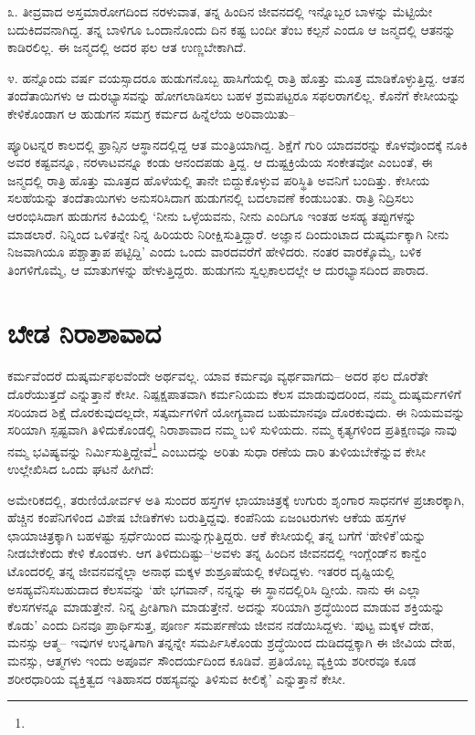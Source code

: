 ೩. ತೀವ್ರವಾದ ಅಸ್ತಮಾರೋಗದಿಂದ ನರಳುವಾತ, ತನ್ನ ಹಿಂದಿನ ಜೀವನದಲ್ಲಿ ಇನ್ನೊಬ್ಬರ ಬಾಳನ್ನು ಮೆಟ್ಟಿಯೇ ಬದುಕಿದವನಾಗಿದ್ದ. ತನ್ನ ಬಾಳಿಗೂ ಒಂದಾನೊಂದು ದಿನ ಕಷ್ಟ ಬಂದೀ ತೆಂಬ ಕಲ್ಪನೆ ಎಂದೂ ಆ ಜನ್ಮದಲ್ಲಿ ಆತನನ್ನು ಕಾಡಿರಲಿಲ್ಲ. ಈ ಜನ್ಮದಲ್ಲಿ ಅದರ ಫಲ ಆತ ಉಣ್ಣಬೇಕಾಗಿದೆ.

೪. ಹನ್ನೊಂದು ವರ್ಷ ವಯಸ್ಸಾದರೂ ಹುಡುಗನೊಬ್ಬ ಹಾಸಿಗೆಯಲ್ಲಿ ರಾತ್ರಿ ಹೊತ್ತು ಮೂತ್ರ ಮಾಡಿಕೊಳ್ಳುತ್ತಿದ್ದ. ಆತನ ತಂದೆತಾಯಿಗಳು ಆ ದುರಭ್ಯಾಸವನ್ನು ಹೋಗಲಾಡಿಸಲು ಬಹಳ ಶ್ರಮಪಟ್ಟರೂ ಸಫಲರಾಗಲಿಲ್ಲ. ಕೊನೆಗೆ ಕೇಸೀಯನ್ನು ಕೇಳಿಕೊಂಡಾಗ ಆ ಹುಡುಗನ ಸಮಗ್ರ ಕರ್ಮದ ಹಿನ್ನೆಲೆಯ ಅರಿವಾಯಿತು–

ಪ್ಯೂರಿಟನ್ನರ ಕಾಲದಲ್ಲಿ ಫ್ರಾನ್ಸಿನ ಆಸ್ಥಾನದಲ್ಲಿದ್ದ ಆತ ಮಂತ್ರಿಯಾಗಿದ್ದ. ಶಿಕ್ಷೆಗೆ ಗುರಿ ಯಾದವರನ್ನು ಕೊಳವೊಂದಕ್ಕೆ ನೂಕಿ ಅವರ ಕಷ್ಟವನ್ನೂ, ನರಳಾಟವನ್ನೂ ಕಂಡು ಆನಂದಪಡು ತ್ತಿದ್ದ. ಆ ದುಷ್ಟಕ್ರಿಯೆಯ ಸಂಕೇತವೋ ಎಂಬಂತೆ, ಈ ಜನ್ಮದಲ್ಲಿ ರಾತ್ರಿ ಹೊತ್ತು ಮೂತ್ರದ ಹೊಳೆಯಲ್ಲಿ ತಾನೇ ಬಿದ್ದುಕೊಳ್ಳುವ ಪರಿಸ್ಥಿತಿ ಅವನಿಗೆ ಬಂದಿತ್ತು. ಕೇಸೀಯ ಸಲಹೆಯನ್ನು ತಂದೆತಾಯಿಗಳು ಅನುಸರಿಸಿದಾಗ ಹುಡುಗನಲ್ಲಿ ಬದಲಾವಣೆ ಕಂಡುಬಂತು. ರಾತ್ರಿ ನಿದ್ರಿಸಲು ಆರಂಭಿಸಿದಾಗ ಹುಡುಗನ ಕಿವಿಯಲ್ಲಿ ‘ನೀನು ಒಳ್ಳೆಯವನು, ನೀನು ಎಂದಿಗೂ ಇಂತಹ ಅಸಹ್ಯ ತಪ್ಪುಗಳನ್ನು ಮಾಡಲಾರೆ. ನಿನ್ನಿಂದ ಒಳಿತನ್ನೇ ನಿನ್ನ ಹಿರಿಯರು ನಿರೀಕ್ಷಿಸುತ್ತಿದ್ದಾರೆ. ಅಜ್ಞಾನ ದಿಂದುಂಟಾದ ದುಷ್ಕರ್ಮಕ್ಕಾಗಿ ನೀನು ನಿಜವಾಗಿಯೂ ಪಶ್ಚಾತ್ತಾಪ ಪಟ್ಟಿದ್ದಿ’ ಎಂದು ಒಂದು ವಾರದವರೆಗೆ ಹೇಳಿದರು. ನಂತರ ವಾರಕ್ಕೊಮ್ಮೆ, ಬಳಿಕ ತಿಂಗಳಿಗೊಮ್ಮೆ, ಆ ಮಾತುಗಳನ್ನು ಹೇಳುತ್ತಿದ್ದರು. ಹುಡುಗನು ಸ್ವಲ್ಪಕಾಲದಲ್ಲೇ ಆ ದುರಭ್ಯಾಸದಿಂದ ಪಾರಾದ.


\section{ಬೇಡ ನಿರಾಶಾವಾದ}

ಕರ್ಮವೆಂದರೆ ದುಷ್ಕರ್ಮಫಲವೆಂದೇ ಅರ್ಥವಲ್ಲ. ಯಾವ ಕರ್ಮವೂ ವ್ಯರ್ಥವಾಗದು– ಅದರ ಫಲ ದೊರೆತೇ ದೊರೆಯುತ್ತದೆ ಎನ್ನುತ್ತಾನೆ ಕೇಸೀ. ನಿಷ್ಪಕ್ಷಪಾತವಾಗಿ ಕರ್ಮನಿಯಮ ಕೆಲಸ ಮಾಡುವುದರಿಂದ, ನಮ್ಮ ದುಷ್ಕರ್ಮಗಳಿಗೆ ಸರಿಯಾದ ಶಿಕ್ಷೆ ದೊರಕುವುದಲ್ಲದೇ, ಸತ್ಕರ್ಮಗಳಿಗೆ ಯೋಗ್ಯವಾದ ಬಹುಮಾನವೂ ದೊರಕುವುದು. ಈ ನಿಯಮವನ್ನು ಸರಿಯಾಗಿ ಸ್ಪಷ್ಟವಾಗಿ ತಿಳಿದುಕೊಂಡಲ್ಲಿ ನಿರಾಶಾವಾದ ನಮ್ಮ ಬಳಿ ಸುಳಿಯದು. ನಮ್ಮ ಕೃತ್ಯಗಳಿಂದ ಪ್ರತಿಕ್ಷಣವೂ ನಾವು ನಮ್ಮ ಭವಿಷ್ಯವನ್ನು ನಿರ್ಮಿಸುತ್ತಿದ್ದೇವೆ\footnote{} ಎಂಬುದನ್ನು ಅರಿತು ಸುಧಾ ರಣೆಯ ದಾರಿ ತುಳಿಯಬೇಕೆನ್ನುವ ಕೇಸೀ ಉಲ್ಲೇಖಿಸಿದ ಒಂದು ಘಟನೆ ಹೀಗಿದೆ:

ಅಮೇರಿಕದಲ್ಲಿ, ತರುಣಿಯೋರ್ವಳ ಅತಿ ಸುಂದರ ಹಸ್ತಗಳ ಛಾಯಾಚಿತ್ರಕ್ಕೆ ಉಗುರು ಶೃಂಗಾರ ಸಾಧನಗಳ ಪ್ರಚಾರಕ್ಕಾಗಿ, ಹೆಚ್ಚಿನ ಕಂಪೆನಿಗಳಿಂದ ವಿಶೇಷ ಬೇಡಿಕೆಗಳು ಬರುತ್ತಿದ್ದವು. ಕಂಪೆನಿಯ ಏಜಂಟರುಗಳು ಆಕೆಯ ಹಸ್ತಗಳ ಛಾಯಾಚಿತ್ರಕ್ಕಾಗಿ ಬಹಳಷ್ಟು ಸ್ಪರ್ಧೆಯಿಂದ ಮುನ್ನುಗ್ಗುತ್ತಿದ್ದರು. ಆಕೆ ಕೇಸೀಯಲ್ಲಿ ತನ್ನ ಬಗೆಗೆ ‘ಹೇಳಿಕೆ’ಯನ್ನು ನೀಡಬೇಕೆಂದು ಕೇಳಿ ಕೊಂಡಳು. ಆಗ ತಿಳಿದುದಿಷ್ಟು–‘ಅವಳು ತನ್ನ ಹಿಂದಿನ ಜೀವನದಲ್ಲಿ ಇಂಗ್ಲೆಂಡ್​ನ ಕಾನ್ವೆಂ ಟೊಂದರಲ್ಲಿ ತನ್ನ ಜೀವನವನ್ನೆಲ್ಲಾ ಅನಾಥ ಮಕ್ಕಳ ಶುಶ್ರೂಷೆಯಲ್ಲಿ ಕಳೆದಿದ್ದಳು. ಇತರರ ದೃಷ್ಟಿಯಲ್ಲಿ ಅಸಹ್ಯವೆನಿಸಬಹುದಾದ ಕೆಲಸವನ್ನು ‘ಹೇ ಭಗವಾನ್, ನನ್ನನ್ನು ಈ ಸ್ಥಾನದಲ್ಲಿರಿಸಿ ದ್ದೀಯೆ. ನಾನು ಈ ಎಲ್ಲಾ ಕೆಲಸಗಳನ್ನೂ ಮಾಡುತ್ತೇನೆ. ನಿನ್ನ ಪ್ರೀತಿಗಾಗಿ ಮಾಡುತ್ತೇನೆ. ಅದನ್ನು ಸರಿಯಾಗಿ ಶ್ರದ್ಧೆಯಿಂದ ಮಾಡುವ ಶಕ್ತಿಯನ್ನು ಕೊಡು’ ಎಂದು ದಿನವೂ ಪ್ರಾರ್ಥಿಸುತ್ತ, ಪೂರ್ಣ ಸಮರ್ಪಣೆಯ ಜೀವನ ನಡೆಯಿಸಿದ್ದಳು. ‘ಪುಟ್ಟ ಮಕ್ಕಳ ದೇಹ, ಮನಸ್ಸು ಆತ್ಮ– ಇವುಗಳ ಉನ್ನತಿಗಾಗಿ ತನ್ನನ್ನೇ ಸಮರ್ಪಿಸಿಕೊಂಡು ಶ್ರದ್ಧೆಯಿಂದ ದುಡಿದದ್ದಕ್ಕಾಗಿ ಈ ಜೀವಿಯ ದೇಹ, ಮನಸ್ಸು, ಆತ್ಮಗಳು ಇಂದು ಅಪೂರ್ವ ಸೌಂದರ್ಯದಿಂದ ಕೂಡಿವೆ. ಪ್ರತಿಯೊಬ್ಬ ವ್ಯಕ್ತಿಯ ಶರೀರವೂ ಕೂಡ ಶರೀರಧಾರಿಯ ವ್ಯಕ್ತಿತ್ವದ ಇತಿಹಾಸದ ರಹಸ್ಯವನ್ನು ತಿಳಿಸುವ ಕೀಲಿಕೈ’ ಎನ್ನುತ್ತಾನೆ ಕೇಸೀ.


